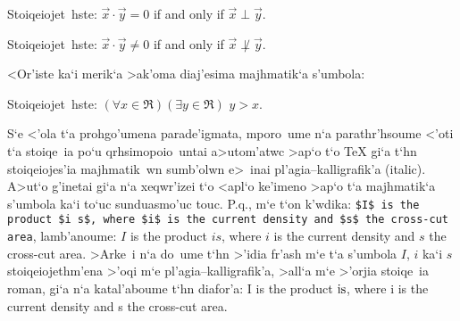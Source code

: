 
\exercise Stoiqeiojet~hste: {\rm $\vec x\cdot \vec y  = 0$ if and only
if $\vec x \perp \vec y$. }

\exercise Stoiqeiojet~hste: {\rm $\vec x\cdot \vec y \not= 0$ if and
only if $\vec x \not\perp \vec y$. }

<Or'iste ka`i merik`a >ak'oma diaj'esima majhmatik`a s'umbola:%

\halign{
\strut \hfil$#$ & \quad \tt# \hfil \qquad &\hfil$#$ & \quad \tt# \hfil \qquad
      &\hfil$#$ & \quad \tt# \hfil \qquad &\hfil$#$ & \quad \tt# \hfil \cr
\noalign{\hrule} \noalign{\smallskip}
\aleph & \\aleph & \ell & \\ell & \Re & \\Re & \Im & \\Im \cr
\partial & \\partial & \infty & \\infty & \| & \\| & \angle & \\angle \cr
\nabla & \\nabla & \backslash &\\backslash & \forall & \\forall
              & \exists & \\exists \cr
\neg & \\neg & \flat & \\flat & \sharp & \\sharp & \natural & \\natural \cr
        }

\toindex{|}

\exercise Stoiqeiojet~hste: $(\forall x\in \Re)(\exists y\in\Re)$ $y>x$.

S`e <'ola t`a prohgo'umena parade'igmata, mporo~ume n`a parathr'hsoume
<'oti t`a stoiqe~ia po`u qrhsimopoio~untai a>utom'atwc >ap`o t`o
{\rm\TeX} gi`a t`hn stoiqeiojes'ia majhmatik~wn sumb'olwn e>~inai
pl'agia--kalligrafik'a ({\rm italic}).  A>ut`o g'inetai gi`a n`a
xeqwr'izei t`o <apl`o ke'imeno >ap`o t`a ma\-jh\-ma\-ti\-k`a s'umbola
ka`i to`uc sunduasmo'uc touc.  P.q., m`e t`on k'wdika: {\tt \$I\$ is the
product \$i s\$, where \$i\$ is the current density and \$s\$ the
cross-cut area}, lam\-b'a\-nou\-me: {\rm $I$ is the product $is$, where
$i$ is the current density and $s$ the cross-cut area}.  >Arke~i n`a
do~ume t`hn >'idia fr'ash m`e t`a s'umbola $I$, $i$ ka`i $s$
stoiqeiojethm'ena >'oqi m`e pl'agia--kalligrafik'a, >all`a m`e >'orjia
stoiqe~ia {\rm roman}, gi`a n`a katal'aboume t`hn diafor'a: {\rm I is
the product $\rm i s$, where i is the current density and s the
cross-cut area}.

